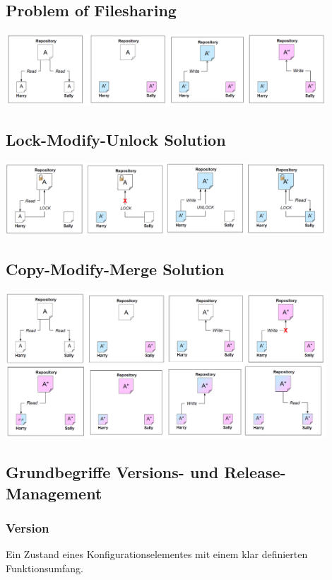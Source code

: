 \documentclass[10pt]{article}
\begin{document}
\subsection{Problem of Filesharing}
\includegraphics[width=0.9\textwidth]{assets/problem_of_filesharing.png}

\subsection{Lock-Modify-Unlock Solution}
\includegraphics[width=0.9\textwidth]{assets/lock_modify_unlock_solution.png}

\subsection{Copy-Modify-Merge Solution}
\includegraphics[width=0.9\textwidth]{assets/copy_modify_merge_solution.png}

\subsection{Grundbegriffe Versions- und Release-Management}
\subsubsection{Version}
Ein Zustand eines Konfigurationselementes mit einem klar definierten Funktionsumfang.
\end{document}
